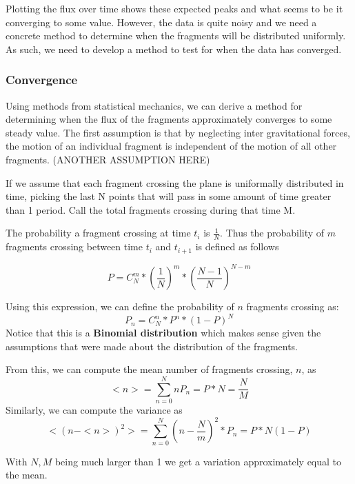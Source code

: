 \documentclass{article}
\newcommand{\boldindex}[1]{%
	\textbf{#1}\index{#1}%
}
\begin{document}
Plotting the flux over time shows these expected peaks and what seems to be it converging to some value. However, the data is quite noisy and we need a concrete method to determine when the fragments will be distributed uniformly. As such, we need to develop a method to test for when the data has converged.

 \subsubsection{Convergence}
 
 Using methods from statistical mechanics, we can derive a method for determining when the flux of the fragments approximately converges to some steady value.
 The first assumption is that by neglecting inter gravitational forces, the motion of an individual fragment is independent of the motion of all other fragments.  (ANOTHER ASSUMPTION HERE)
 
 If we assume that each fragment crossing the plane is uniformally distributed in time, picking the last N points that will pass in some amount of time greater than 1 period. Call the total fragments crossing during that time M.
 
 The probability a fragment crossing at time $t_i$ is $\frac{1}{N}$. Thus the probability of $m$ fragments crossing between time $t_i$ and $t_{i+1}$ is defined as follows
 
 \begin{equation}
 	P = C^m_N * (\frac{1}{N})^m * (\frac{N - 1}{N})^{N-m}
 \end{equation}

\noindent Using this expression, we can define the probability of $n$ fragments crossing as:
\begin{equation}
	P_n = C^n_N * P^n * (1 - P)^N
\end{equation}
Notice that this is a \boldindex{Binomial distribution} which makes sense given the assumptions that were made about the distribution of the fragments.

From this, we can compute the mean number of fragments crossing, $n$, as
\begin{equation}
	<n> = \sum_{n=0}^{N} n P_n = P * N = \frac{N}{M}
\end{equation}
Similarly, we can compute the variance as
\begin{equation}
	<(n-<n>)^2> = \sum_{n=0}^{N}(n - \frac{N}{m})^2 * P_n = P * N (1 - P)
\end{equation}

With $N, M$ being much larger than 1 we get a variation approximately equal to the mean.
\end{document}

